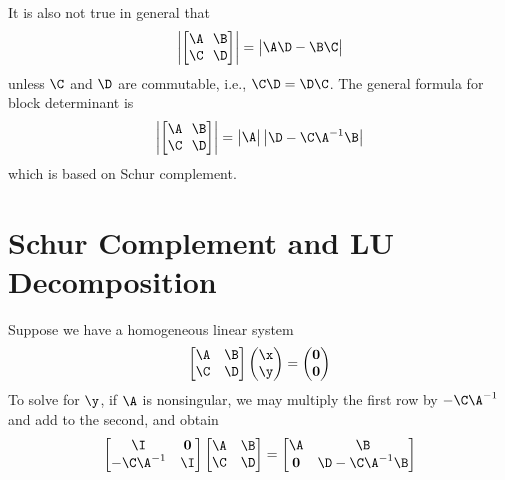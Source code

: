 It is also not true in general that
\begin{align*}
    \begin{vmatrix}\left[\begin{matrix}\A ~~ \B \\ \C ~~  \D\end{matrix}\right]\end{vmatrix} = \begin{vmatrix}\A\D-\B\C\end{vmatrix}
\end{align*}
unless $\C$ and $\D$ are commutable, i.e., $\C\D = \D\C$. The general formula for block determinant is
\begin{align}
    \begin{vmatrix}\left[\begin{matrix}\A ~~ \B \\ \C ~~  \D\end{matrix}\right]\end{vmatrix} = \begin{vmatrix}\A\end{vmatrix}\begin{vmatrix}\D - \C\A^{-1}\B\end{vmatrix}
\end{align}
which is based on Schur complement.

\section{Schur Complement and LU Decomposition}
Suppose we have a homogeneous linear system
\begin{align}
	\left[\begin{matrix}\A & \B \\ \C & \D \end{matrix}\right] \left(\begin{matrix} \x \\ \y \end{matrix}\right) = \left(\begin{matrix} \mathbf{0} \\ \mathbf{0} \end{matrix}\right)
\end{align}
To solve for $\y$, if $\A$ is nonsingular, we may multiply the first row by $-\C\A^{-1}$ and add to the second, and obtain
\begin{align}\label{eq:shurA}
	\left[\begin{matrix}\I & \mathbf{0} \\ -\C\A^{-1} & \I \end{matrix}\right] \left[\begin{matrix}\A & \B \\ \C & \D \end{matrix}\right] = \left[\begin{matrix}\A & \B \\ \mathbf{0} & \D-\C\A^{-1}\B \end{matrix}\right]	
\end{align}

